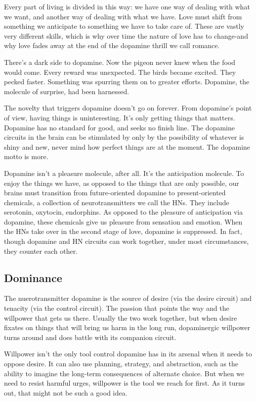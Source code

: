 \documentclass[ebook,12pt,oneside,openany]{memoir}
\begin{document}
Every part of living is divided in this way: we have one way of dealing with what we want, and another way of dealing with what we have.
Love must shift from something we anticipate to something we have to take care of.
These are vastly very different skills, which is why over time the nature of love has to change-and why love fades away at the end of the dopamine 
thrill we call romance.

There's a dark side to dopamine. Now the pigeon never knew when the food would come.
Every reward was unexpected. The birds became excited. They pecked faster. Something was spurring them on to greater efforts.
Dopamine, the molecule of surprise, had been harnessed.

The novelty that triggers dopamine doesn't go on forever. From dopamine's point of view, having things is uninteresting.
It's only getting things that matters.
Dopamine has no standard for good, and seeks no finish line.
The dopamine circuits in the brain can be stimulated by only by the possibility of whatever is shiny and new, 
never mind how perfect things are at the moment. The dopamine motto is more.

Dopamine isn't a pleasure molecule, after all. It's the anticipation molecule.
To enjoy the things we have, as opposed to the things that are only possible, 
our brains must transition from future-oriented dopamine to present-oriented chemicals,
a collection of neurotransmitters we call the HNs.
They include serotonin, oxytocin, endorphins.
As opposed to the pleasure of anticipation via dopamine, 
these chemicals give us pleasure from sensation and emotion.
When the HNs take over in the second stage of love, dopamine is suppressed. 
In fact, though dopamine and HN circuits can work together, 
under most circumstances, they counter each other.

\subsection{Dominance}
The nuerotransmitter dopamine is the source of desire (via the desire circuit) and tenacity (via the control circuit).
The passion that points the way and the willpower that gets us there.
Usually the two work together, but when desire fixates on things that will bring us harm in the long run, dopaminergic willpower
turns around and does battle with its companion circuit.

Willpower isn't the only tool control dopamine has in its arsenal when it needs to oppose desire.
It can also use planning, strategy, and abstraction, such as the ability to imagine the long-term consequences of alternate choice.
But when we need to resist harmful urges, willpower is the tool we reach for first.
As it turns out, that might not be such a good idea. 
\end{document}
